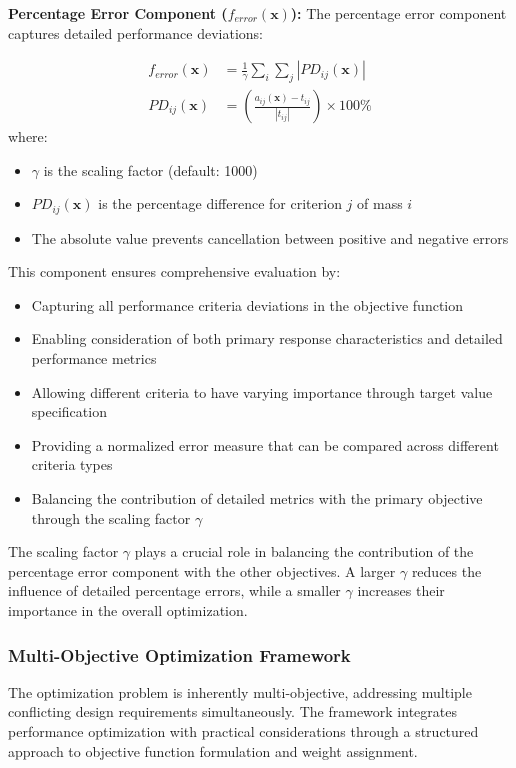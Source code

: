 \documentclass[12pt,a4paper]{article}
\begin{document}
\textbf{Percentage Error Component ($f_{error}(\mathbf{x})$):} The percentage error component captures detailed performance deviations:

\begin{align}\label{Eq.percentage_error_detailed}
f_{error}(\mathbf{x}) &= \frac{1}{\gamma} \sum_{i} \sum_{j} \left| PD_{ij}(\mathbf{x}) \right|\\
PD_{ij}(\mathbf{x}) &= \left( \frac{a_{ij}(\mathbf{x}) - t_{ij}}{|t_{ij}|} \right) \times 100\%
\end{align}
where:
\begin{itemize}
    \item $\gamma$ is the scaling factor (default: 1000)
    \item $PD_{ij}(\mathbf{x})$ is the percentage difference for criterion $j$ of mass $i$
    \item The absolute value prevents cancellation between positive and negative errors
\end{itemize}

This component ensures comprehensive evaluation by:
\begin{itemize}
    \item Capturing all performance criteria deviations in the objective function
    \item Enabling consideration of both primary response characteristics and detailed performance metrics
    \item Allowing different criteria to have varying importance through target value specification
    \item Providing a normalized error measure that can be compared across different criteria types
    \item Balancing the contribution of detailed metrics with the primary objective through the scaling factor $\gamma$
\end{itemize}

The scaling factor $\gamma$ plays a crucial role in balancing the contribution of the percentage error component with the other objectives. A larger $\gamma$ reduces the influence of detailed percentage errors, while a smaller $\gamma$ increases their importance in the overall optimization.

\subsubsection{Multi-Objective Optimization Framework}

The optimization problem is inherently multi-objective, addressing multiple conflicting design requirements simultaneously. The framework integrates performance optimization with practical considerations through a structured approach to objective function formulation and weight assignment.
\end{document}
